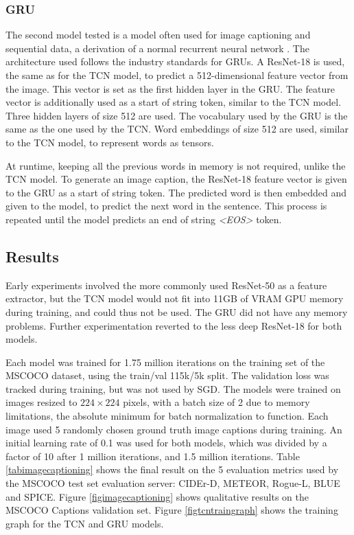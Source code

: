\documentclass[a4paper, twoside]{article}
\begin{document}
\subsubsection{GRU}
The second model tested is a model often used for image captioning and sequential data, a derivation of a normal recurrent neural network \cite{cs231n}. The architecture used follows the industry standards for GRUs. A ResNet-18 is used, the same as for the TCN model, to predict a 512-dimensional feature vector from the image. This vector is set as the first hidden layer in the GRU. The feature vector is additionally used as a start of string token, similar to the TCN model. Three hidden layers of size 512 are used. The vocabulary used by the GRU is the same as the one used by the TCN. Word embeddings of size 512 are used, similar to the TCN model, to represent words as tensors.

At runtime, keeping all the previous words in memory is not required, unlike the TCN model. To generate an image caption, the ResNet-18 feature vector is given to the GRU as a start of string token. The predicted word is then embedded and given to the model, to predict the next word in the sentence. This process is repeated until the model predicts an end of string \textit{<EOS>} token.

\subsection{Results}
Early experiments involved the more commonly used ResNet-50 as a feature extractor, but the TCN model would not fit into 11GB of VRAM GPU memory during training, and could thus not be used. The GRU did not have any memory problems. Further experimentation reverted to the less deep ResNet-18 for both models.

Each model was trained for 1.75 million iterations on the training set of the MSCOCO dataset, using the train/val 115k/5k split. The validation loss was tracked during training, but was not used by SGD. The models were trained on images resized to $224 \times 224$ pixels, with a batch size of 2 due to memory limitations, the absolute minimum for batch normalization to function. Each image used 5 randomly chosen ground truth image captions during training. An initial learning rate of 0.1 was used for both models, which was divided by a factor of 10 after 1 million iterations, and 1.5 million iterations. Table \ref{tabimagecaptioning} shows the final result on the 5 evaluation metrics used by the MSCOCO test set evaluation server: CIDEr-D, METEOR, Rogue-L, BLUE and SPICE. Figure \ref{figimagecaptioning} shows qualitative results on the MSCOCO Captions validation set. Figure \ref{figtcntraingraph} shows the training graph for the TCN and GRU models.
\end{document}
